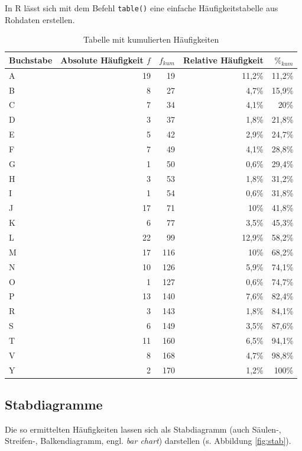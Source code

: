 \documentclass[
  11pt,
  ngerman,
  a4paper,
]{report}
\newenvironment{rtip}{
  \medskip
  \begin{tcolorbox}[colframe=purple,colback=light_gray,title=Softwarehinweis]
}{
  \end{tcolorbox}
  \medskip
}
\begin{document}
\begin{rtip}
In R lässt sich mit dem Befehl \verb|table()| eine einfache Häufigkeitstabelle aus Rohdaten erstellen.
\end{rtip}

\begin{table}

\caption{\label{tab:haeufkum}Tabelle mit kumulierten Häufigkeiten}
\centering
\begin{tabular}[t]{lrrrr}
\toprule
Buchstabe & Absolute Häufigkeit $f$ & $f_{kum}$ & Relative Häufigkeit & $\%_{kum}$\\
\midrule
A & 19 & 19 & 11,2\% & 11,2\%\\
B & 8 & 27 & 4,7\% & 15,9\%\\
C & 7 & 34 & 4,1\% & 20\%\\
D & 3 & 37 & 1,8\% & 21,8\%\\
E & 5 & 42 & 2,9\% & 24,7\%\\
F & 7 & 49 & 4,1\% & 28,8\%\\
G & 1 & 50 & 0,6\% & 29,4\%\\
H & 3 & 53 & 1,8\% & 31,2\%\\
I & 1 & 54 & 0,6\% & 31,8\%\\
J & 17 & 71 & 10\% & 41,8\%\\
K & 6 & 77 & 3,5\% & 45,3\%\\
L & 22 & 99 & 12,9\% & 58,2\%\\
M & 17 & 116 & 10\% & 68,2\%\\
N & 10 & 126 & 5,9\% & 74,1\%\\
O & 1 & 127 & 0,6\% & 74,7\%\\
P & 13 & 140 & 7,6\% & 82,4\%\\
R & 3 & 143 & 1,8\% & 84,1\%\\
S & 6 & 149 & 3,5\% & 87,6\%\\
T & 11 & 160 & 6,5\% & 94,1\%\\
V & 8 & 168 & 4,7\% & 98,8\%\\
Y & 2 & 170 & 1,2\% & 100\%\\
\bottomrule
\end{tabular}
\end{table}

\hypertarget{stabdiagramme}{%
\subsection{Stabdiagramme}\label{stabdiagramme}}

Die so ermittelten Häufigkeiten lassen sich als Stabdiagramm (auch Säulen-, Streifen-, Balkendiagramm, engl. \emph{bar chart}) darstellen (s. Abbildung \ref{fig:stab}).
\end{document}
